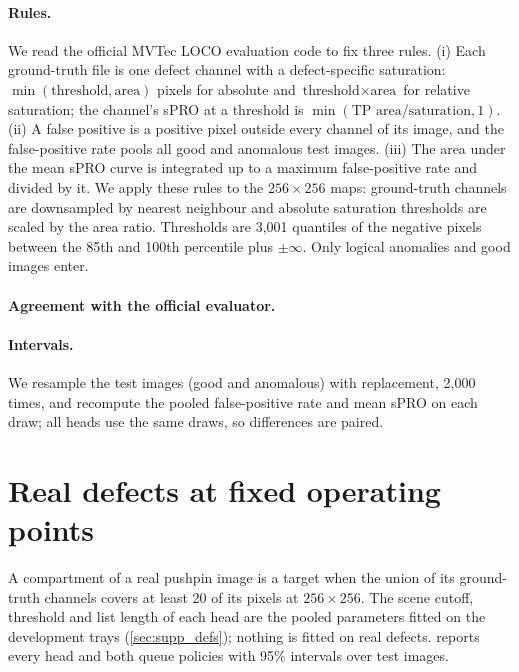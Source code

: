 \paragraph{Rules.} We read the official MVTec LOCO evaluation code to fix three rules. (i) Each ground-truth file is one defect channel with a defect-specific saturation: $\min(\text{threshold},\text{area})$ pixels for absolute and $\text{threshold}\times\text{area}$ for relative saturation; the channel's sPRO at a threshold is $\min(\text{TP area}/\text{saturation},1)$. (ii) A false positive is a positive pixel outside every channel of its image, and the false-positive rate pools all good and anomalous test images. (iii) The area under the mean sPRO curve is integrated up to a maximum false-positive rate and divided by it. We apply these rules to the $256{\times}256$ maps: ground-truth channels are downsampled by nearest neighbour and absolute saturation thresholds are scaled by the area ratio. Thresholds are 3{,}001 quantiles of the negative pixels between the 85th and 100th percentile plus $\pm\infty$. Only logical anomalies and good images enter.
\paragraph{Agreement with the official evaluator.} \officialSentence
\paragraph{Intervals.} We resample the test images (good and anomalous) with replacement, 2{,}000 times, and recompute the pooled false-positive rate and mean sPRO on each draw; all heads use the same draws, so differences are paired.
\begin{table}[t]
\centering
\caption{Native logical anomalies in every category with a retrained pair: AU-sPRO up to 5\% FPR (\%) with 95\% intervals, and image AUROC (\%).}
\label{tab:native_full}
\footnotesize\setlength{\tabcolsep}{3pt}

\end{table}

\section{Real defects at fixed operating points}
\label{sec:supp_op}
A compartment of a real pushpin image is a target when the union of its ground-truth channels covers at least 20 of its pixels at $256{\times}256$. The scene cutoff, threshold and list length of each head are the pooled parameters fitted on the development trays (\cref{sec:supp_defs}); nothing is fitted on real defects.  reports every head and both queue policies with 95\% intervals over test images.
